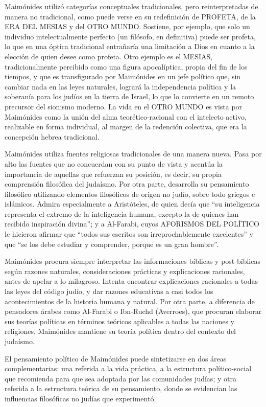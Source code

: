 \documentclass[
]{book}
\begin{document}
Maimónides utilizó categorías conceptuales tradicionales, pero reinterpretadas de manera no tradicional, como puede verse en su redefinición de PROFETA, de la ERA DEL MESIAS y del OTRO MUNDO. Sostiene, por ejemplo, que solo un individuo intelectualmente perfecto (un filósofo, en definitiva) puede ser profeta, lo que en una óptica tradicional entrañaría una limitación a Dios en cuanto a la elección de quien desee como profeta. Otro ejemplo es el MESIAS, tradicionalmente percibido como una figura apocalíptica, propia del fin de los tiempos, y que es transfigurado por Maimónides en un jefe político que, sin cambiar nada en las leyes naturales, logrará la independencia política y la soberanía para los judíos en la tierra de Israel, lo que lo convierte en un remoto precursor del sionismo moderno. La vida en el OTRO MUNDO es vista por Maimónides como la unión del alma teorético-racional con el intelecto activo, realizable en forma individual, al margen de la redención colectiva, que era la concepción hebrea tradicional.

Maimónides utiliza fuentes religiosas tradicionales de una manera nueva. Pasa por alto las fuentes que no concuerdan con su punto de vista y acentúa la importancia de aquellas que refuerzan su posición, es decir, su propia comprensión filosófica del judaísmo. Por otra parte, desarrolla su pensamiento filosófico utilizando elementos filosóficos de origen no judío, sobre todo griegos e islámicos. Admira especialmente a Aristóteles, de quien decía que ``su inteligencia representa el extremo de la inteligencia humana, excepto la de quienes han recibido inspiración divina''; y a Al-Farabi, cuyos AFORISMOS DEL POLÍTICO le hicieron afirmar que ``todos sus escritos son irreprochablemente excelentes'' y que ``se los debe estudiar y comprender, porque es un gran hombre''.

Maimónides procura siempre interpretar las informaciones bíblicas y post-bíblicas según razones naturales, consideraciones prácticas y explicaciones racionales, antes de apelar a lo milagroso. Intenta encontrar explicaciones racionales a todas las leyes del código judío, y dar razones educativas a casi todos los acontecimientos de la historia humana y natural. Por otra parte, a diferencia de pensadores árabes como Al-Farabi o Ibn-Ruchd (Averroes), que procuran elaborar sus teorías políticas en términos teóricos aplicables a todas las naciones y religiones, Maimónides mantiene su teoría política dentro del contexto del judaísmo.

El pensamiento político de Maimónides puede sintetizarse en dos áreas complementarias: una referida a la vida práctica, a la estructura político-social que recomienda para que sea adoptada por las comunidades judías; y otra referida a la estructura teórica de su pensamiento, donde se evidencian las influencias filosóficas no judías que experimentó.
\end{document}

